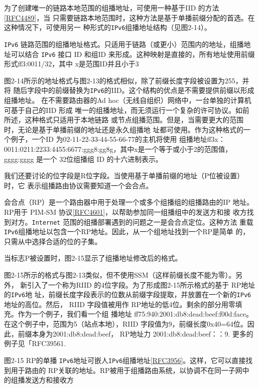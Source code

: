 为了创建唯一的链路本地范围的组播地址，可使用一种基于IID 的方法\href{https://www.rfc-editor.org/rfc/rfc4489}{[RFC4489]}，当
只需要链路本地范围时，这种方法是基于单播前缀分配的首选。在这种情况下，可使用另一
种形式的\verb|IPv6|组播地址结构（见图2-14）。

\verb|IPv6| 链路范围的组播地址格式。只适用于链路（或更小）范围内的地址，组播地址可以结合
\verb|IPv6| 接口 ID 和组ID 来形成。这种映射是直接的，所有地址使用前缀形式ff3:0011/32，其中
x是范围ID并且小于3

图2-14所示的地址格式与图2-13的格式相似，除了前缀长度字段被设置为255，并将
随后字段中的前缀替换为\verb|IPv6|的IID。这个结构的优点是不需要提供前缀以形成组播地址。
在不需要路由器的Ad hoc（无线自组织）网络中，一台单独的计算机可基于自己的IID 形成
唯一的组播地址，而无须运行一个复杂的许可协议。如前所述，这种格式只适用于本地链路
或节点组播范围。但是，当需要更大的范围时，无论是基于单播前缀的地址还是永久组播地
址都可使用。作为这种格式的一个例子，一个ID 为02-11-22-33-44-55-66-77的主机将使用
组播地址ff3x：0011:0211:2233:4455:6677:ggg8:gg8g，其中x是一个等于或小于2的范围值，
gggg:gggg 是一个 32位组播组 ID 的十六进制表示。

我们还要讨论的位字段是R位字段。当使用基于单播前缀的地址（P位被设置）时，它
表示组播路由协议需要知道一个会合点。

\begin{tcolorbox}
    会合点（RP）是一个路由器中用于处理一个或多个组播组的组播路由的IP
    地址。RP用于 PIM-SM 协议\href{https://www.rfc-editor.org/rfc/rfc4601}{[RFC4601]}，以帮助参加同一组播组中的发送方和接
    收方找到对方。\verb|Internet| 范围的组播部署遇到的问题之一是会合点定位。这种方法
    重载\verb|IPv6|组播地址以包含一个RP地址。因此，从一个组地址找到一个RP是简单
    的，只需从中选择合适的位的子集。
\end{tcolorbox}

当标志P被设置时，图2-15显示了组播地址修改后的格式。

图2-15所示的格式与图2-13类似，但不使用SSM（这样前缀长度不能为零）。另外，
新引入了一个称为RIID 的4位字段。为了形成图2-15所示格式的基于 RP地址的\verb|IPv6|地
址，前缀长度字段表示的位数从前缀字段提取，并放置在一个新的\verb|IPv6|地址的高位。然后，
RIID 字段值被用作 RP地址的低4位。剩余的部分用零填充。作为一个例子，我们看一个组
播地址 ff75:940:2001:db8:dead:beef:f00d:face。在这个例子中，范围为5（站点本地），RIID
字段值为9，前缀长度0x40=64位。因此，前缀本身为2001:db8:dead:beef， RP地址力
2001:db8:dead:beef：：9. 更多的例子见「RFC39561.

图2-15 RP的单播 \verb|IPv6|地址可嵌人\verb|IPv6|组播地址\href{https://www.rfc-editor.org/rfc/rfc3956}{[RFC3956]}。这样，它可以直接找到用于路由的
RP关联的地址。RP被用于组播路由系统，以协调不在同一子网中的组播发送方和接收方

